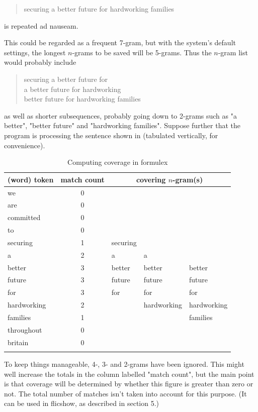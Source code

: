 \documentclass[output=paper]{langscibook}
\begin{document}
\begin{quote}
securing a better future for hardworking families
\end{quote}
is repeated ad nauseam.

This could be regarded as a frequent 7-gram, but with the system's default settings, the longest $n$-grams to be saved will be 5-grams. Thus the $n$-gram list would probably include

\begin{quote}
securing a better future for\\
a better future for hardworking\\
better future for hardworking families
\end{quote}
as well as shorter subsequences, probably going down to 2-grams such as "a better", "better future" and "hardworking families". Suppose further that the program is processing the sentence shown in  (tabulated vertically, for convenience).

\begin{table}
\caption{Computing coverage in formulex\label{tab:forsyth:4}}
\begin{tabular}{lclll}
\lsptoprule
(word) token & match count & \multicolumn{3}{c}{covering $n$-gram(s)}\\\midrule
we          & 0 &  &  & \\
are         & 0 &  &  & \\
committed   & 0 &  &  & \\
to          & 0 &  &  & \\
securing    & 1 & securing &  & \\
a           & 2 & a & a & \\
better      & 3 & better & better & better\\
future      & 3 & future & future & future\\
for         & 3 & for & for & for\\
hardworking & 2 &  & hardworking & hardworking\\
families    & 1 &  &  & families\\
throughout  & 0 &  &  & \\
britain     & 0 &  &  & \\
\lspbottomrule
\end{tabular}
\end{table}

To keep things manageable, 4-, 3- and 2-grams have been ignored. This might well increase the totals in the column labelled "match count", but the main point is that coverage will be determined by whether this figure is greater than zero or not. The total number of matches isn't taken into account for this purpose. (It can be used in flicshow, as described in section 5.)
\end{document}
